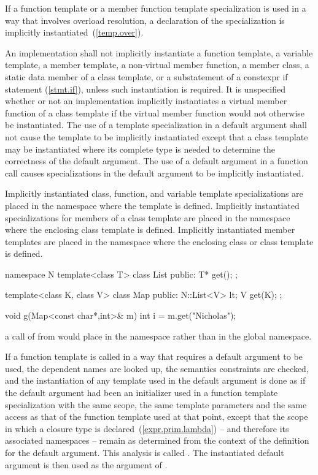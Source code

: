 \pnum
If a function template or a member function template specialization is used in
a way that involves overload resolution,
a declaration of the specialization is implicitly instantiated~(\ref{temp.over}).

\pnum
An implementation shall not implicitly instantiate a function template,
a variable template,
a member template, a non-virtual member function, a member class, a
static data member of a class template, or a substatement of a constexpr if
statement (\ref{stmt.if}), unless such instantiation is required.
It is unspecified whether or not an implementation implicitly instantiates a
virtual member function of a class template if the virtual member function would
not otherwise be instantiated.
The use of a template specialization in a default argument
shall not cause the template to be implicitly instantiated except that a
class template may be instantiated where its complete type is needed to determine
the correctness of the default argument.
The use of a default argument in a
function call causes specializations in the default argument to be implicitly
instantiated.

\pnum
Implicitly instantiated class, function, and variable template specializations
are placed in the namespace where the template is defined.
Implicitly instantiated specializations for members of a class template are
placed in the namespace where the enclosing class template is defined.
Implicitly instantiated member templates are placed in the namespace where the
enclosing class or class template is defined.
\begin{example}

\begin{codeblock}
namespace N {
  template<class T> class List {
  public:
    T* get();
  };
}

template<class K, class V> class Map {
public:
  N::List<V> lt;
  V get(K);
};

void g(Map<const char*,int>& m) {
  int i = m.get("Nicholas");
}
\end{codeblock}

a call of
from
would place
in the namespace
rather than in the global namespace.
\end{example}

\pnum
If a function template
is called in a way that requires a default argument to be used,
the dependent names are looked up, the semantics constraints are checked,
and the instantiation of any template used in the default argument
is done as if the default argument had been
an initializer used in a function template specialization with the same scope,
the same template parameters and the same access as that of the function template
used at that point, except that the scope in which a closure type is
declared~(\ref{expr.prim.lambda}) -- and therefore its associated namespaces --
remain as determined from the context of the definition for the default
argument.
This analysis is called
.
The instantiated default argument is then used as the argument of
.

